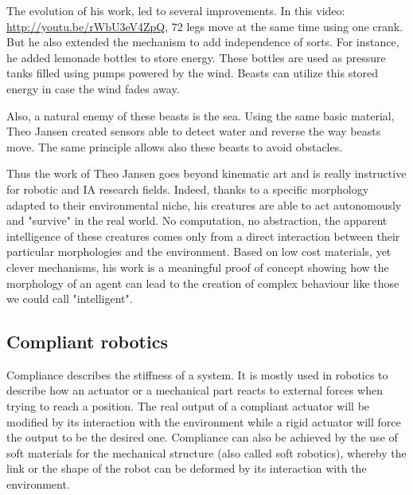 The evolution of his work, led to several improvements. In this video: \url{http://youtu.be/rWbU3eV4ZpQ}, 72 legs move at the same time using one crank. But he also extended the mechanism to add independence of sorts. For instance, he added lemonade bottles to store energy. These bottles are used as pressure tanks filled using pumps powered by the wind. Beasts can utilize this stored energy in case the wind fades away.

Also, a natural enemy of these beasts is the sea. Using the same basic material, Theo Jansen created sensors able to detect water and reverse the way beasts move. The same principle allows also these beasts to avoid obstacles.

Thus the work of Theo Jansen goes beyond kinematic art and is really instructive for robotic and IA research fields. Indeed, thanks to a specific morphology adapted to their environmental niche, his creatures are able to act autonomously and "survive" in the real world. No computation, no abstraction, the apparent intelligence of these creatures comes only  from a direct interaction between their particular morphologies and the environment. Based on low cost materials, yet clever mechanisms, his work is a meaningful proof of concept showing how the morphology of an agent can lead to the creation of complex behaviour like those we could call "intelligent".





\subsection{Compliant robotics} %
Compliance describes the stiffness of a system. It is mostly used in robotics to describe how an actuator or a mechanical part reacts to external forces when trying to reach a position. The real output of a compliant actuator will be modified by its interaction with the environment while a rigid actuator will force the output to be the desired one. Compliance can also be achieved by the use of soft materials for the mechanical structure (also called soft robotics), whereby the link or the shape of the robot can be deformed by its interaction with the environment.


